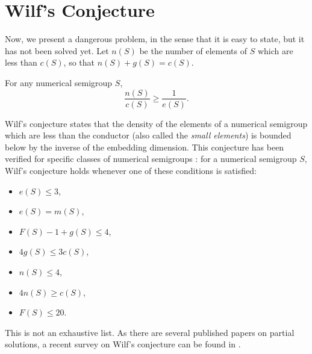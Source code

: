 \section{Wilf's Conjecture}\label{sec:smgps:theme2}

Now, we present a dangerous problem, in the sense that it is easy to state, but it has not been solved yet. Let $n(S)$ be the number of elements of $S$ which are less than $c(S)$, so that $n(S) + g(S) = c(S)$.\par 

\begin{conjecture}[Wilf, 1978] \cite{wilf1978circle}\label{conj:smgps:wilf}
    For any numerical semigroup $S$,
    \[\frac{n(S)}{c(S)} \geq \frac{1}{e(S)}.\]
\end{conjecture}

Wilf's conjecture states that the density of the elements of a numerical semigroup which are less than the conductor (also called the \textit{small elements}) is bounded below by the inverse of the embedding dimension. This conjecture has been verified for specific classes of numerical semigroups \cite{assi2020numerical}: for a numerical semigroup $S$, Wilf's conjecture holds whenever one of these conditions is satisfied:
\begin{itemize}
    \item $e(S) \leq 3$,
    \item $e(S) = m(S)$,
    \item $F(S) - 1 + g(S) \leq 4$,
    \item $4g(S) \leq 3c(S)$,
    \item $n(S) \leq 4$,
    \item $4n(S) \geq c(S)$,
    \item $F(S) \leq 20$.
\end{itemize}

This is not an exhaustive list. As there are several published papers on partial solutions, a recent survey on Wilf's conjecture can be found in \cite{2020conjecture}. \par